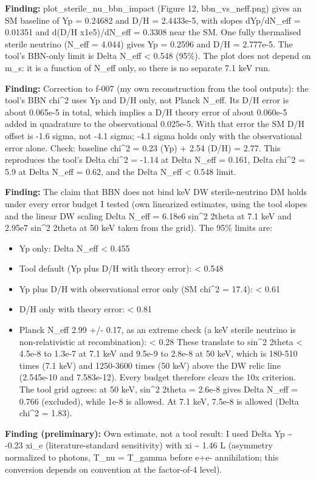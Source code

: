 \documentclass[11pt,a4paper]{article}
\begin{document}
\textbf{Finding:} plot\_sterile\_nu\_bbn\_impact (Figure 12, bbn\_vs\_neff.png) gives an SM baseline of Yp = 0.24682 and D/H = 2.4433e-5, with slopes dYp/dN\_eff = 0.01351 and d(D/H x1e5)/dN\_eff = 0.3308 near the SM. One fully thermalised sterile neutrino (N\_eff = 4.044) gives Yp = 0.2596 and D/H = 2.777e-5. The tool's BBN-only limit is Delta N\_eff \textless{} 0.548 (95\%). The plot does not depend on m\_s: it is a function of N\_eff only, so there is no separate 7.1 keV run.

\textbf{Finding:} Correction to f-007 (my own reconstruction from the tool outputs): the tool's BBN chi\textasciicircum{}2 uses Yp and D/H only, not Planck N\_eff. Its D/H error is about 0.065e-5 in total, which implies a D/H theory error of about 0.060e-5 added in quadrature to the observational 0.025e-5. With that error the SM D/H offset is -1.6 sigma, not -4.1 sigma; -4.1 sigma holds only with the observational error alone. Check: baseline chi\textasciicircum{}2 = 0.23 (Yp) + 2.54 (D/H) = 2.77. This reproduces the tool's Delta chi\textasciicircum{}2 = -1.14 at Delta N\_eff = 0.161, Delta chi\textasciicircum{}2 = 5.9 at Delta N\_eff = 0.62, and the Delta N\_eff \textless{} 0.548 limit.

\textbf{Finding:} The claim that BBN does not bind keV DW sterile-neutrino DM holds under every error budget I tested (own linearized estimates, using the tool slopes and the linear DW scaling Delta N\_eff = 6.18e6 sin\textasciicircum{}2 2theta at 7.1 keV and 2.95e7 sin\textasciicircum{}2 2theta at 50 keV taken from the grid). The 95\% limits are:

\begin{itemize}
  \item Yp only: Delta N\_eff \textless{} 0.455
  \item Tool default (Yp plus D/H with theory error): \textless{} 0.548
  \item Yp plus D/H with observational error only (SM chi\textasciicircum{}2 = 17.4): \textless{} 0.61
  \item D/H only with theory error: \textless{} 0.81
  \item Planck N\_eff 2.99 +/- 0.17, as an extreme check (a keV sterile neutrino is non-relativistic at recombination): \textless{} 0.28
These translate to sin\textasciicircum{}2 2theta \textless{} 4.5e-8 to 1.3e-7 at 7.1 keV and 9.5e-9 to 2.8e-8 at 50 keV, which is 180-510 times (7.1 keV) and 1250-3600 times (50 keV) above the DW relic line (2.545e-10 and 7.583e-12). Every budget therefore clears the 10x criterion. The tool grid agrees: at 50 keV, sin\textasciicircum{}2 2theta = 2.6e-8 gives Delta N\_eff = 0.766 (excluded), while 1e-8 is allowed. At 7.1 keV, 7.5e-8 is allowed (Delta chi\textasciicircum{}2 = 1.83).

\end{itemize}
\textbf{Finding (preliminary):} Own estimate, not a tool result: I used Delta Yp \textasciitilde{} -0.23 xi\_e (literature-standard sensitivity) with xi \textasciitilde{} 1.46 L (asymmetry normalized to photons, T\_nu = T\_gamma before e+e- annihilation; this conversion depends on convention at the factor-of-4 level).
\end{document}
